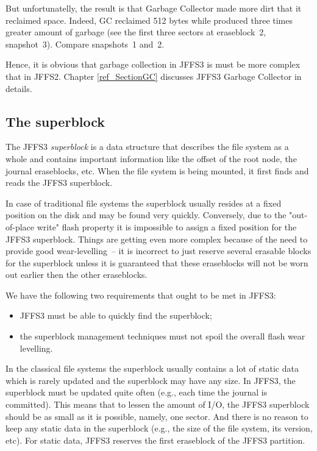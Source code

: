 But unfortunatelly, the result is that Garbage Collector made more dirt that it
reclaimed space. Indeed, GC reclaimed 512 bytes while produced three times
greater amount of garbage (see the first three sectors at eraseblock~2,
snapshot~3). Compare snapshots~1 and~2.

Hence, it is obvious that garbage collection in JFFS3 is must be more complex
that in JFFS2. Chapter \ref{ref_SectionGC} discusses JFFS3 Garbage Collector in
details.

%
%
\subsection{The superblock}

The JFFS3 \emph{superblock} is a data structure that describes the file system
as a whole and contains important information like the offset of the root node,
the journal eraseblocks, etc. When the file system is being mounted, it first
finds and reads the JFFS3 superblock.

In case of traditional file systems the superblock usually resides at a fixed
position on the disk and may be found very quickly. Conversely, due to the
"\mbox{out-of-place} write" flash property it is impossible to assign a fixed
position for the JFFS3 superblock. Things are getting even more complex because
of the need to provide good \mbox{wear-levelling}~-- it is incorrect to just
reserve several erasable blocks for the superblock unless it is guaranteed that
these eraseblocks will not be worn out earlier then the other eraseblocks.

We have the following two requirements that ought to be met in JFFS3:

\begin{itemize}

\item JFFS3 must be able to quickly find the superblock;

\item the superblock management techniques must not spoil the overall flash
wear levelling.

\end{itemize}

In the classical file systems the superblock usually contains a lot of static
data which is rarely updated and the superblock may have any size. In JFFS3,
the superblock must be updated quite often (e.g., each time the journal is
committed). This means that to lessen the amount of I/O, the JFFS3 superblock
should be as small as it is possible, namely, one sector. And there is no
reason to keep any static data in the superblock (e.g., the size of the file
system, its version, etc). For static data, JFFS3 reserves the first eraseblock
of the JFFS3 partition.

